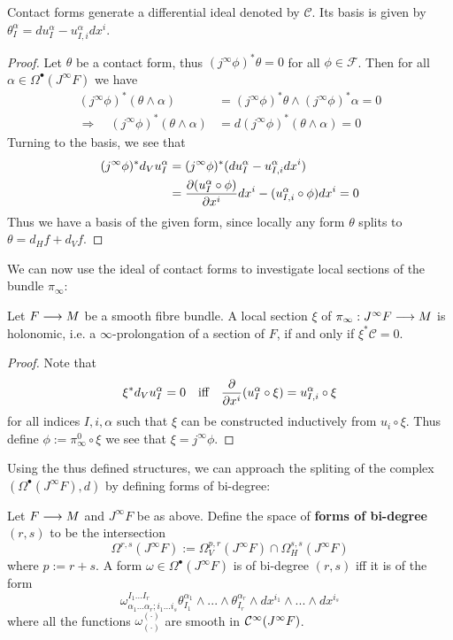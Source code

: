 \begin{theo}
  Contact forms generate a differential ideal denoted by $\mathcal{C}$. Its basis is given by $\theta^\alpha_I = du^\alpha_I - u^\alpha_{I,i} dx^i$.
\begin{proof}
  Let $\theta$ be a contact form, thus $(j^\infty \phi)^* \theta = 0$ for all $\phi \in \mathcal{F}$. Then for all $\alpha \in \Omega^\bullet(J^\infty F)$ we have
  \begin{align*}
    (j^\infty \phi)^* (\theta \wedge \alpha) &= (j^\infty \phi)^* \theta \wedge (j^\infty \phi)^* \alpha = 0\\
    \Rightarrow \quad (j^\infty \phi)^* (\theta \wedge \alpha) &= d(j^\infty \phi)^* (\theta \wedge \alpha) = 0
  \end{align*}
  Turning to the basis, we see that
  \begin{align*}
    (j^\infty \phi)^* d_V u^\alpha_I &= (j^\infty \phi)^*(du^\alpha_I - u^\alpha_{I,i} dx^i)\\
    &= \dell{(u^\alpha_I \circ \phi)}{x^i} dx^i - (u^\alpha_{I,i} \circ \phi) dx^i = 0
  \end{align*}
  Thus we have a basis of the given form, since locally any form $\theta$ splits to $\theta = d_H f + d_V f$.
\end{proof}
\end{theo}

We can now use the ideal of contact forms to investigate local sections of the bundle $\pi_\infty$:

\begin{lem}
  Let $F\longrightarrow M$ be a smooth fibre bundle. A local section $\xi$ of $\pi_\infty: J^\infty F \longrightarrow M$ is holonomic, i.e. a $\infty$-prolongation of a section of $F$, if and only if $\xi^* \mathcal{C} = 0$.
\begin{proof}
  Note that
  $$ \xi^* d_V u^\alpha_I = 0 \quad \text{iff} \quad \frac{\partial }{\partial x^i} (u^\alpha_I \circ \xi) = u^\alpha_{I,i} \circ \xi $$
  for all indices $I,i,\alpha$ such that $\xi$ can be constructed inductively from $u_i \circ \xi$. Thus define $\phi := \pi_\infty^0 \circ \xi$ we see that $\xi = j^\infty \phi$.
\end{proof}
\end{lem}

Using the thus defined structures, we can approach the spliting of the complex $(\Omega^\bullet(J^\infty F), d)$ by defining forms of bi-degree:

\begin{definition}
  Let $F \longrightarrow M$ and $J^\infty F$ be as above. Define the space of \textbf{forms of bi-degree $(r,s)$} to be the intersection
  $$ \Omega^{r,s}(J^\infty F) := \Omega_V^{p,r}(J^\infty F) \cap \Omega_H^{s,s}(J^\infty F) $$
  where $p:= r+s$. A form $\omega \in \Omega^\bullet(J^\infty F)$ is of bi-degree $(r,s)$ iff it is of the form
  $$ \omega^{I_1 ... I_r}_{\alpha_1 ... \alpha_r ; i_1 ... i_s} \theta^{\alpha_1}_{I_1} \wedge ... \wedge \theta^{\alpha_r}_{I_r} \wedge dx^{i_1} \wedge ... \wedge dx^{i_s}$$
  where all the functions $\omega^{(\cdot)}_{(\cdot)}$ are smooth in $\mathcal{C}^{\infty}(J^\infty F)$.
\end{definition}


